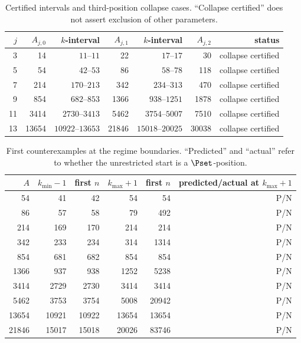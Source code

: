 \begin{table}[h]
\centering
\caption{Certified intervals and third-position collapse cases. ``Collapse certified'' does not assert exclusion of other parameters.}\label{tab:Chierarchy}
\begin{tabular}{rrrrrrr}
\toprule
$j$ & $A_{j,0}$ & $k$-interval & $A_{j,1}$ & $k$-interval & $A_{j,2}$ & status\\
\midrule
3 & 14 & $11$--$11$ & 22 & $17$--$17$ & 30 & collapse certified\\
5 & 54 & $42$--$53$ & 86 & $58$--$78$ & 118 & collapse certified\\
7 & 214 & $170$--$213$ & 342 & $234$--$313$ & 470 & collapse certified\\
9 & 854 & $682$--$853$ & 1366 & $938$--$1251$ & 1878 & collapse certified\\
11 & 3414 & $2730$--$3413$ & 5462 & $3754$--$5007$ & 7510 & collapse certified\\
13 & 13654 & $10922$--$13653$ & 21846 & $15018$--$20025$ & 30038 & collapse certified\\
\bottomrule
\end{tabular}
\end{table}

\begin{table}[h]
\centering
\caption{First counterexamples at the regime boundaries. ``Predicted'' and ``actual'' refer to whether the unrestricted start is a $\Pset$-position.}\label{tab:Cboundary}
\begin{tabular}{rrrrrr}
\toprule
$A$ & $k_{\min}-1$ & first $n$ & $k_{\max}+1$ & first $n$ & predicted/actual at $k_{\max}+1$\\
\midrule
54 & 41 & 42 & 54 & 54 & P/N\\
86 & 57 & 58 & 79 & 492 & P/N\\
214 & 169 & 170 & 214 & 214 & P/N\\
342 & 233 & 234 & 314 & 1314 & P/N\\
854 & 681 & 682 & 854 & 854 & P/N\\
1366 & 937 & 938 & 1252 & 5238 & P/N\\
3414 & 2729 & 2730 & 3414 & 3414 & P/N\\
5462 & 3753 & 3754 & 5008 & 20942 & P/N\\
13654 & 10921 & 10922 & 13654 & 13654 & P/N\\
21846 & 15017 & 15018 & 20026 & 83746 & P/N\\
\bottomrule
\end{tabular}
\end{table}

